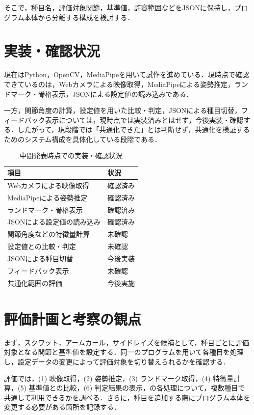 \documentclass[no-page-number]{nanzan-abstract}
\begin{document}
そこで，種目名，評価対象関節，基準値，許容範囲などをJSONに保持し，プログラム本体から分離する構成を検討する．

\section{実装・確認状況}
現在はPython，OpenCV，MediaPipeを用いて試作を進めている．現時点で確認できているのは，Webカメラによる映像取得，MediaPipeによる姿勢推定，ランドマーク・骨格表示，JSONによる設定値の読み込みである．

一方，関節角度の計算，設定値を用いた比較・判定，JSONによる種目切替，フィードバック表示については，現時点では実装済みとはせず，今後実装・確認する．したがって，現段階では「共通化できた」とは判断せず，共通化を検証するためのシステム構成を具体化している段階である．

\begin{table}[H]
  \caption{中間発表時点での実装・確認状況}
  \label{tbl:status}
  \centering
  \scriptsize
  \begin{tabular}{p{}p{}}
    \hline
    項目 & 状況 \\\hline
    Webカメラによる映像取得 & 確認済み \\
    MediaPipeによる姿勢推定 & 確認済み \\
    ランドマーク・骨格表示 & 確認済み \\
    JSONによる設定値の読み込み & 確認済み \\
    関節角度などの特徴量計算 & 未確認 \\
    設定値との比較・判定 & 未確認 \\
    JSONによる種目切替 & 今後実装 \\
    フィードバック表示 & 未確認 \\
    共通化範囲の評価 & 今後実施 \\\hline
  \end{tabular}
\end{table}

\section{評価計画と考察の観点}
まず，スクワット，アームカール，サイドレイズを候補として，種目ごとに評価対象となる関節と基準値を設定する．同一のプログラムを用いて各種目を処理し，設定データの変更によって評価対象を切り替えられるかを確認する．

評価では，(1) 映像取得，(2) 姿勢推定，(3) ランドマーク取得，(4) 特徴量計算，(5) 基準値との比較，(6) 判定結果の表示，の各処理について，複数種目で共通して利用できるかを調べる．さらに，種目を追加する際にプログラム本体を変更する必要がある箇所を記録する．
\end{document}
